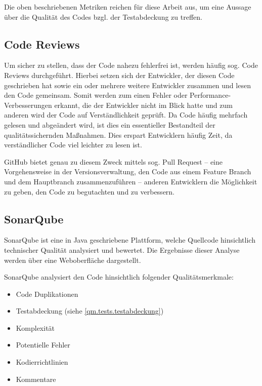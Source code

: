				Die oben beschriebenen Metriken reichen für diese Arbeit aus, um eine Aussage über die Qualität des Codes bzgl. der Testabdeckung zu treffen. 
				
		\subsection{Code Reviews}
		
			Um sicher zu stellen, dass der Code nahezu fehlerfrei ist, werden häufig sog. Code Reviews durchgeführt. Hierbei setzen sich der Entwickler, der diesen Code geschrieben hat sowie ein oder mehrere weitere Entwickler zusammen und lesen den Code gemeinsam. Somit werden zum einen Fehler oder Performance-Verbesserungen erkannt, die der Entwickler nicht im Blick hatte und zum anderen wird der Code auf Verständlichkeit geprüft. Da Code häufig mehrfach gelesen und abgeändert wird, ist dies ein essentieller Bestandteil der qualitätssichernden Maßnahmen. Dies erspart Entwicklern häufig Zeit, da verständlicher Code viel leichter zu lesen ist.
			
			GitHub bietet genau zu diesem Zweck mittels sog. Pull Request -- eine Vorgehensweise in der Versionsverwaltung, den Code aus einem Feature Branch und dem Hauptbranch zusammenzuführen -- anderen Entwicklern die Möglichkeit zu geben, den Code zu begutachten und zu verbessern.			
		
		\subsection{SonarQube}
		
			SonarQube ist eine in Java geschriebene Plattform, welche Quellcode hinsichtlich  technischer Qualität analysiert und bewertet. Die Ergebnisse dieser Analyse werden über eine Weboberfläche dargestellt. \cite{SonarSourceS.A.2142020} 
			
			SonarQube analysiert den Code hinsichtlich folgender Qualitätsmerkmale:
			
			\begin{itemize}
				\item Code Duplikationen
				\item Testabdeckung (siehe \autoref{qm.tests.testabdeckung})
				\item Komplexität
				\item Potentielle Fehler
				\item Kodierrichtlinien
				\item Kommentare
			\end{itemize}
		
